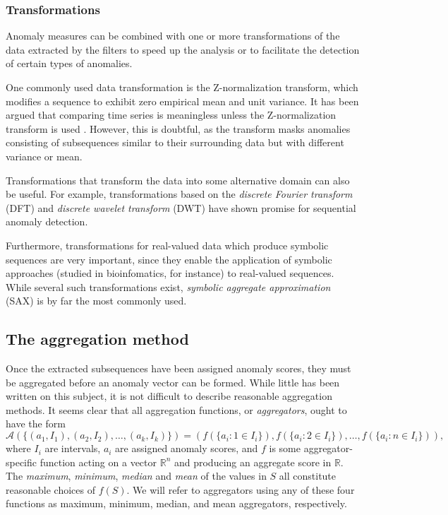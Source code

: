 \subsubsection{Transformations}
Anomaly measures can be combined with one or more transformations of the data extracted by the filters to speed up the analysis or to facilitate the detection of certain types of anomalies.

One commonly used data transformation is the Z-normalization transform, which modifies a sequence to exhibit zero empirical mean and unit variance. It has been argued that comparing time series is meaningless unless the Z-normalization transform is used \cite{keogh5}. However, this is doubtful, as the transform masks anomalies consisting of subsequences similar to their surrounding data but with different variance or mean.

Transformations that transform the data into some alternative domain can also be useful. For example, transformations based on the \emph{discrete Fourier transform} (DFT) and \emph{discrete wavelet transform} (DWT) \cite{fu} have shown promise for sequential anomaly detection.

Furthermore, transformations for real-valued data which produce symbolic sequences are very important, since they enable the application of symbolic approaches (studied in bioinfomatics, for instance) to real-valued sequences. While several such transformations exist, \emph{symbolic aggregate approximation} (SAX) \cite{sax} is by far the most commonly used.

\subsection{The aggregation method}
\label{sect:aggregation_method}

Once the extracted subsequences have been assigned anomaly scores, they must be aggregated before an anomaly vector can be formed. While little has been written on this subject, it is not difficult to describe reasonable aggregation methods. It seems clear that all aggregation functions, or \emph{aggregators}, ought to have the form
\[
    \mathcal{A}(\{(a_1, I_1), (a_2, I_2), \dots, (a_k, I_k) \}) = (f(\{a_i: 1 \in I_i\}), f(\{a_i: 2 \in I_i\}), \dots, f(\{a_i: n \in I_i\})),
\]
where $I_i$ are intervals, $a_i$ are assigned anomaly scores, and $f$ is some aggregator-specific function acting on a vector $\mathbb{R}^n$ and producing an aggregate score in $\mathbb{R}$. The \emph{maximum}, \emph{minimum}, \emph{median} and \emph{mean} of the values in $S$ all constitute reasonable choices of $f(S)$. We will refer to aggregators using any of these four functions as maximum, minimum, median, and mean aggregators, respectively.
